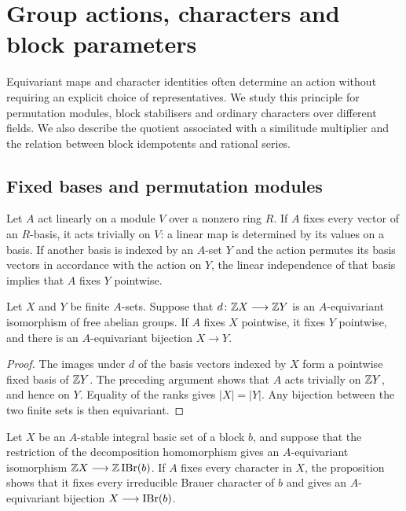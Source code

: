 \chapter{Group actions, characters and block parameters}
\label{chap:library-current}

Equivariant maps and character identities often determine an action without
requiring an explicit choice of representatives. We study this principle for
permutation modules, block stabilisers and ordinary characters over different
fields. We also describe the quotient associated with a similitude multiplier
and the relation between block idempotents and rational series.

\section{Fixed bases and permutation modules}

Let $A$ act linearly on a module $V$ over a nonzero ring $R$. If $A$ fixes every
vector of an $R$-basis, it acts trivially on $V$: a linear map is determined
by its values on a basis. If another basis is indexed by an $A$-set $Y$
and the action permutes its basis vectors in accordance with the action on
$Y$, the linear independence of that basis implies that $A$ fixes $Y$
pointwise.

\begin{proposition}
Let $X$ and $Y$ be finite $A$-sets. Suppose that
$d\colon\mathbb Z X\longrightarrow\mathbb Z Y$ is an $A$-equivariant isomorphism of
free abelian groups. If $A$ fixes $X$ pointwise, it fixes $Y$ pointwise,
and there is an $A$-equivariant bijection $X\longrightarrow Y$.
\end{proposition}

\begin{proof}
The images under $d$ of the basis vectors indexed by $X$ form a pointwise
fixed basis of $\mathbb Z Y$. The preceding argument shows that $A$ acts trivially
on $\mathbb Z Y$, and hence on $Y$. Equality of the ranks gives $|X|=|Y|$.
Any bijection between the two finite sets is then equivariant.
\end{proof}

Let $X$ be an $A$-stable integral basic set of a block $b$, and suppose
that the restriction of the decomposition homomorphism gives an
$A$-equivariant isomorphism $\mathbb Z X\longrightarrow\mathbb Z\operatorname{IBr}(b)$.
If $A$ fixes every character in $X$, the proposition shows that it
fixes every irreducible Brauer character of $b$ and gives an
$A$-equivariant bijection $X\longrightarrow\operatorname{IBr}(b)$.

